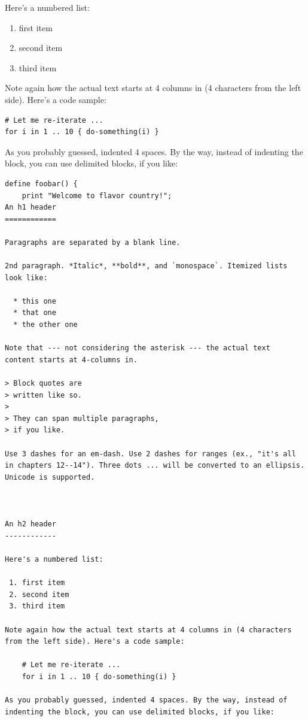 \documentclass[
  12pt,
  a4paper,
  oneside,tablecaptionabove
]{scrbook}
\providecommand{\tightlist}{%
  \setlength{\itemsep}{0pt}\setlength{\parskip}{0pt}}
\begin{document}
Here's a numbered list:

\begin{enumerate}
\def\labelenumi{\arabic{enumi}.}
\tightlist
\item
  first item
\item
  second item
\item
  third item
\end{enumerate}

Note again how the actual text starts at 4 columns in (4 characters from
the left side). Here's a code sample:

\begin{lstlisting}
# Let me re-iterate ...
for i in 1 .. 10 { do-something(i) }
\end{lstlisting}

As you probably guessed, indented 4 spaces. By the way, instead of
indenting the block, you can use delimited blocks, if you like:

\begin{lstlisting}
define foobar() {
    print "Welcome to flavor country!";
An h1 header
============

Paragraphs are separated by a blank line.

2nd paragraph. *Italic*, **bold**, and `monospace`. Itemized lists
look like:

  * this one
  * that one
  * the other one

Note that --- not considering the asterisk --- the actual text
content starts at 4-columns in.

> Block quotes are
> written like so.
>
> They can span multiple paragraphs,
> if you like.

Use 3 dashes for an em-dash. Use 2 dashes for ranges (ex., "it's all
in chapters 12--14"). Three dots ... will be converted to an ellipsis.
Unicode is supported.



An h2 header
------------

Here's a numbered list:

 1. first item
 2. second item
 3. third item

Note again how the actual text starts at 4 columns in (4 characters
from the left side). Here's a code sample:

    # Let me re-iterate ...
    for i in 1 .. 10 { do-something(i) }

As you probably guessed, indented 4 spaces. By the way, instead of
indenting the block, you can use delimited blocks, if you like:
\end{lstlisting}
\end{document}
